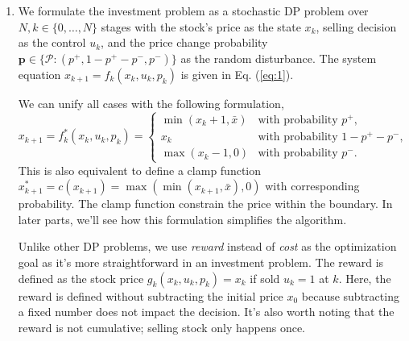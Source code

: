 \documentclass[11pt]{article}
\begin{document}
\begin{enumerate}[label=(\alph*)]
    \item
    We formulate the investment problem as a stochastic DP problem over $N, k \in \{0, \dots, N\}$ stages with the stock's price as the state $x_k$, selling decision as the control $u_k$, and the price change probability $\boldsymbol p \in \{\mathcal{P}:(p^+, 1 - p^+ - p^-, p^-)\}$ as the random disturbance.
    The system equation $x_{k+1} = f_k(x_k, u_k, p_k)$ is given in Eq. (\ref{eq:1}).
    
    We can unify all cases with the following formulation,
   \begin{equation}\label{eq:3}
    x_{k+1} = f_k^*(x_k, u_k, p_k) = \begin{cases}
    \min(x_{k} + 1, \bar x) & \text{with probability } p^+, \\
    x_{k} & \text{with probability } 1 - p^+ - p^-, \\
    \max(x_{k} - 1, 0) & \text{with probability } p^-.
    \end{cases}
    \end{equation}
    This is also equivalent to define a clamp function $x_{k+1}^* = c(x_{k+1}) = \max(\min(x_{k+1}, \bar x), 0)$ with corresponding probability. The clamp function constrain the price within the boundary. In later parts, we'll see how this formulation simplifies the algorithm.
    
    Unlike other DP problems, we use \emph{reward} instead of \emph{cost} as the optimization goal as it's more straightforward in an investment problem. The reward is defined as the stock price $g_k(x_k, u_k, p_k) = x_k$ if sold $u_k = 1$ at $k$. Here, the reward is defined without subtracting the initial price $x_0$ because subtracting a fixed number does not impact the decision. It's also worth noting that the reward is not cumulative; selling stock only happens once.
    

\end{enumerate}
\end{document}
